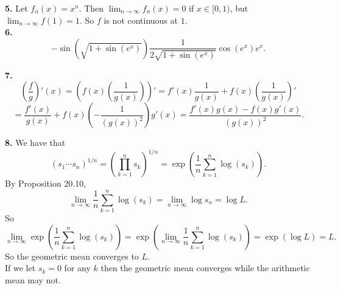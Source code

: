 \documentclass{article}
\newcommand{\lb}{\left(}
\newcommand{\rb}{\right)}
\begin{document}
\textbf{5.} Let $f_n(x) = x^n$. Then $\lim_{n\to \infty} f_n(x) = 0$ if $x \in [0, 1)$, but $\lim_{n\to\infty} f(1) = 1$. So $f$ is not continuous at $1$. \\

\textbf{6.} $$-\sin\lb\sqrt{1 + \sin(e^x)}\rb\frac{1}{2\sqrt{1 + \sin(e^x)}}\cos(e^x)e^x.$$

\textbf{7.} $$\lb\frac{f}{g}\rb'(x) = \lb f(x)\lb\frac{1}{g(x)}\rb\rb' = f'(x)\frac{1}{g(x)} + f(x)\lb\frac{1}{g(x)}\rb'$$
$$= \frac{f'(x)}{g(x)} + f(x)\lb -\frac{1}{(g(x))^2}\rb g'(x) = \frac{f'(x)g(x) - f(x)g'(x)}{(g(x))^2}.$$

\textbf{8.} We have that
$$(s_1\cdots s_n)^{1/n} = \lb\prod_{k = 1}^n s_k\rb^{1/n} = \exp\lb\frac{1}{n}\sum_{k = 1}^n \log(s_k)\rb.$$
By Proposition 20.10,
$$\lim_{n\to \infty} \frac{1}{n}\sum_{k = 1}^n \log(s_k) = \lim_{n\to \infty} \log s_n = \log L.$$
So
$$\lim_{n\to \infty} \exp\lb\frac{1}{n}\sum_{k = 1}^n \log(s_k)\rb = \exp \lb \lim_{n\to\infty}\frac{1}{n}\sum_{k = 1}^n \log(s_k) \rb = \exp(\log L) = L.$$
So the geometric mean converges to $L$. \\

If we let $s_k = 0$ for any $k$ then the geometric mean converges while the arithmetic mean may not.
\end{document}
